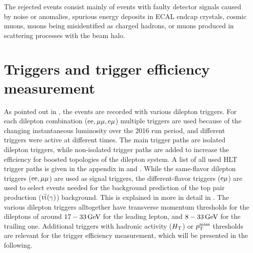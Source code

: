 The rejected events consist mainly of events with faulty detector signals caused by noise or anomalies, spurious energy deposits in ECAL endcap crystals, cosmic muons, muons being misidentified as charged hadrons, or muons produced in scattering processes with the beam halo.


\section{Triggers and trigger efficiency measurement}\label{sec:triggEff}
As pointed out in , the events are recorded with various dilepton triggers. For each dilepton combination ($\mathrm{e}\mathrm{e},{\mu}{\mu},\mathrm{e}{\mu}$) multiple triggers are used because of the changing instantaneous luminosity over the 2016 run period, and different triggers were active at different times. The main trigger paths are isolated dilepton triggers, while non-isolated trigger paths are added to increase the efficiency for boosted topologies of the dilepton system. A list of all used HLT trigger paths is given in the appendix in  and . While the same-flavor dilepton triggers ($\mathrm{e}\mathrm{e},{\mu}{\mu}$) are used as signal triggers, the different-flavor triggers ($\mathrm{e}{\mu}$) are used to select events needed for the background prediction of the top pair production (${\mathrm{t}\overline{\mathrm{t}}}(\gamma)$) background. This is explained in more in detail in . The various dilepton triggers alltogether have transverse momentum thresholds for the dileptons of around $17-33\,\text{Ge\hspace{-.08em}V}$ for the leading lepton, and $8-33\,\text{Ge\hspace{-.08em}V}$ for the trailing one. Additional triggers with hadronic activity ($H_{\mathrm{T}}$) or $p_{\mathrm{T}}^\text{miss}$ thresholds are relevant for the trigger efficiency measurement, which will be presented in the following.
